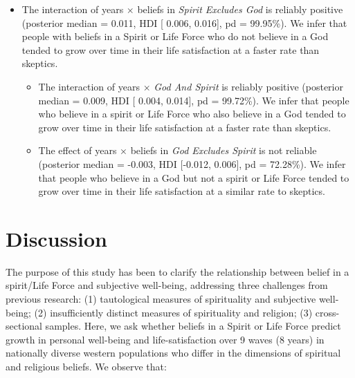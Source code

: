\documentclass[
  english,
  man,floatsintext]{apa6}
\providecommand{\tightlist}{%
  \setlength{\itemsep}{0pt}\setlength{\parskip}{0pt}}
\begin{document}
\begin{itemize}
\tightlist
\item
  The interaction of years \(\times\) beliefs in \emph{Spirit Excludes God} is reliably positive (posterior median = 0.011, HDI {[} 0.006, 0.016{]}, pd = 99.95\%). We infer that people with beliefs in a Spirit or Life Force who do not believe in a God tended to grow over time in their life satisfaction at a faster rate than skeptics.

  \begin{itemize}
  \tightlist
  \item
    The interaction of years \(\times\) \emph{God And Spirit} is reliably positive (posterior median = 0.009, HDI {[} 0.004, 0.014{]}, pd = 99.72\%). We infer that people who believe in a spirit or Life Force who also believe in a God tended to grow over time in their life satisfaction at a faster rate than skeptics.
  \item
    The effect of years \(\times\) beliefs in \emph{God Excludes Spirit} is not reliable (posterior median = -0.003, HDI {[}-0.012, 0.006{]}, pd = 72.28\%). We infer that people who believe in a God but not a spirit or Life Force tended to grow over time in their life satisfaction at a similar rate to skeptics.
  \end{itemize}
\end{itemize}

\hypertarget{discussion}{%
\section{Discussion}\label{discussion}}

The purpose of this study has been to clarify the relationship between belief in a spirit/Life Force and subjective well-being, addressing three challenges from previous research: (1) tautological measures of spirituality and subjective well-being; (2) insufficiently distinct measures of spirituality and religion; (3) cross-sectional samples. Here, we ask whether beliefs in a Spirit or Life Force predict growth in personal well-being and life-satisfaction over 9 waves (8 years) in nationally diverse western populations who differ in the dimensions of spiritual and religious beliefs. We observe that:
\end{document}
